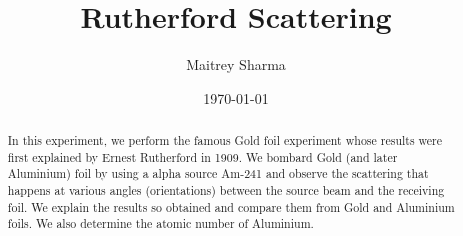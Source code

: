 \documentclass[%
 reprint,
nofootinbib,
 amsmath,amssymb,
 aps,
floatfix,
]{revtex4-2}
\begin{document}

\title{Rutherford Scattering}%


\author{Maitrey Sharma}




\date{\today}%

\begin{abstract}
    In this experiment, we perform the famous Gold foil experiment whose results were first explained by Ernest Rutherford in 1909. We bombard Gold (and later Aluminium) foil by using a alpha source Am-241 and observe the scattering that happens at various angles (orientations) between the source beam and the receiving foil. We explain the results so obtained and compare them from Gold and Aluminium foils. We also determine the atomic number of Aluminium.
\end{abstract}

\keywords{}
\maketitle

\end{document}
